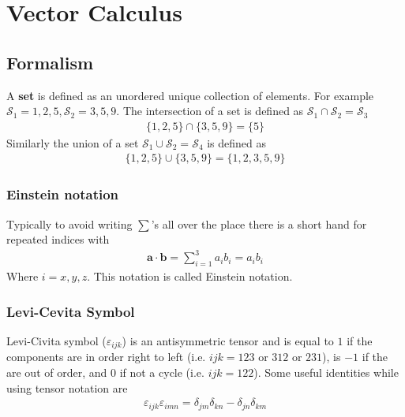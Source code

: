 \chapter{Vector Calculus}

\section{Formalism}
A \textbf{set} is defined as an unordered unique collection of elements. For example $\mathcal{S}_1 = {1,2,5},\mathcal{S}_2 = {3,5,9}$. The intersection of a set is defined as 
$\mathcal{S}_1\cap \mathcal{S}_2 = \mathcal{S}_3 $
\begin{align}
	\{1,2,5\}\cap \{3,5,9\} = \{5\}
\end{align}
Similarly the union of a set $\mathcal{S}_1\cup \mathcal{S}_2 = \mathcal{S}_4$ is defined as
\begin{align}
	\{1,2,5\}\cup \{3,5,9\} = \{1,2,3,5,9\}
\end{align}

\subsection{Einstein notation}
Typically to avoid writing $\sum$'s all over the place there is a short hand for repeated indices with
\begin{align}\label{einstein_notation}
\textbf{a}\cdot\textbf{b} = \sum_{i=1}^3 a_ib_i = a_ib_i
\end{align}
Where $i = x,y,z$. This notation is called Einstein notation.


\subsection{Levi-Cevita Symbol}
 Levi-Civita symbol ($\varepsilon_{ijk}$)  is an antisymmetric tensor and is equal to $1$ if the components are in order right to left (i.e. $ijk = 123$ or $312$ or $231$), is $-1$ if the are out of order, and 0 if not a cycle (i.e. $ijk = 122$). Some useful identities while using tensor notation are
 \begin{align}
 \varepsilon_{ijk}\varepsilon_{imn} = \delta_{jm}\delta_{kn} - \delta_{jn}\delta_{km}
 \end{align}


